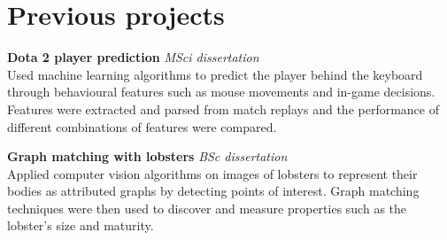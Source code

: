 \documentclass{article}
\newcommand{\n}[0]{\\[\baselineskip]}
\begin{document}
\section*{Previous projects}




\textbf{Dota 2 player prediction} \textit{MSci dissertation} \\
Used machine learning algorithms to predict the player behind the keyboard through 
behavioural features such as mouse movements and in-game decisions. Features were 
extracted and parsed from match replays and the performance of different 
combinations of features were compared.


\textbf{Graph matching with lobsters} \textit{BSc dissertation} \\
Applied computer vision algorithms on images of lobsters to represent their bodies as
attributed graphs by detecting points of interest. Graph matching techniques were then
used to discover and measure properties such as the lobster's size and maturity.


% 
% 
\end{document}
